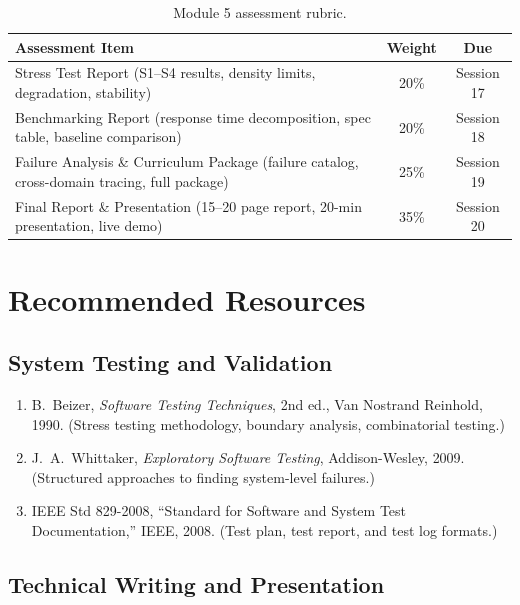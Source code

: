 \documentclass[11pt,letterpaper]{article}
\begin{document}
	\begin{table}[ht!]
		\centering
		\caption{Module 5 assessment rubric.}
		\label{tab:rubric}
		\renewcommand{\arraystretch}{1.3}
		\begin{tabularx}{\textwidth}{X c c}
			\toprule
			\textbf{Assessment Item} & \textbf{Weight} & \textbf{Due} \\
			\midrule
			Stress Test Report (S1--S4 results, density limits, \SNR{} degradation, stability) & 20\% & Session 17 \\
			Benchmarking Report (response time decomposition, spec table, baseline comparison) & 20\% & Session 18 \\
			Failure Analysis \& Curriculum Package (failure catalog, cross-domain tracing, full package) & 25\% & Session 19 \\
			Final Report \& Presentation (15--20 page report, 20-min presentation, live demo) & 35\% & Session 20 \\
			\bottomrule
		\end{tabularx}
	\end{table}

	\newpage
	\section{Recommended Resources}

	\subsection{System Testing and Validation}

	\begin{enumerate}[leftmargin=2em]
		\item B.\ Beizer, \textit{Software Testing Techniques}, 2nd ed., Van Nostrand Reinhold, 1990. (Stress testing methodology, boundary analysis, combinatorial testing.)
		\item J.\ A.\ Whittaker, \textit{Exploratory Software Testing}, Addison-Wesley, 2009. (Structured approaches to finding system-level failures.)
		\item IEEE Std 829-2008, ``Standard for Software and System Test Documentation,'' IEEE, 2008. (Test plan, test report, and test log formats.)
	\end{enumerate}

	\subsection{Technical Writing and Presentation}
\end{document}

